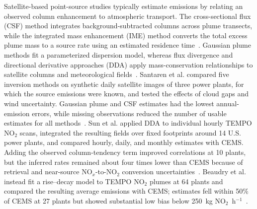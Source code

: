 \documentclass[sigconf,nonacm]{acmart}
\newcommand{\NOx}{NO$_x$}
\begin{document}
Satellite-based point-source studies typically estimate emissions by relating an
observed column enhancement to atmospheric transport. The cross-sectional flux
(CSF) method integrates background-subtracted columns across plume transects, while
the integrated mass enhancement (IME) method converts the total excess plume mass
to a source rate using an estimated residence time~\cite{meier2024conversion,santaren2025benchmarking}.
Gaussian plume methods fit a parameterized dispersion model, whereas flux divergence
and directional derivative approaches (DDA) apply mass-conservation relationships
to satellite columns and meteorological fields~\cite{santaren2025benchmarking,sun2025hourly}.
Santaren et al. compared five inversion methods on synthetic daily satellite images
of three power plants, for which the source emissions were known, and tested the
effects of cloud gaps and wind uncertainty. Gaussian plume and CSF estimates had
the lowest annual-emission errors, while missing observations reduced the number
of usable estimates for all methods~\cite{santaren2025benchmarking}. Sun et al.
applied DDA to individual hourly TEMPO NO$_2$ scans, integrated the resulting fields
over fixed footprints around 14 U.S. power plants, and compared hourly, daily, and
monthly estimates with CEMS. Adding the observed column-tendency term improved
correlations at 10 plants, but the inferred rates remained about four times lower
than CEMS because of retrieval and near-source \NOx{}-to-NO$_2$ conversion
uncertainties~\cite{sun2025hourly}. Beaudry et al. instead fit a rise--decay model
to TEMPO NO$_2$ plumes at 64 plants and compared the resulting average emissions
with CEMS; estimates fell within 50\% of CEMS at 27 plants but showed substantial
low bias below 250~kg NO$_2$~h$^{-1}$~\cite{beaudry2026quantification}.
\end{document}
